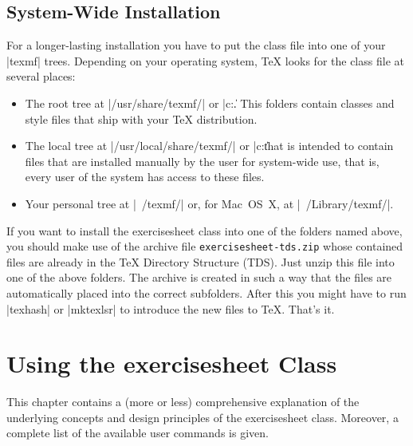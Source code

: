 \documentclass[a4paper,fleqn]{report}
\def\exercisesheet{{exercisesheet}}
\begin{document}
\section{System-Wide Installation}

For a longer-lasting installation you have to put the class file into
one of your |texmf| trees. Depending on your operating system, \TeX{}
looks for the class file at several places:
\begin{itemize}
  \item The root tree at |/usr/share/texmf/| or |c:\texmf\|. This
    folders contain classes and style files that ship with your \TeX{}
    distribution.
  \item The local tree at |/usr/local/share/texmf/| or
    |c:\localtexmf\| that is intended to contain files that are
    installed manually by the user for system-wide use, that is, every
    user of the system has access to these files.
  \item Your personal tree at |~/texmf/| or, for Mac~OS~X, at
    |~/Library/texmf/|.
\end{itemize}
If you want to install the \exercisesheet{} class into one of the
folders named above, you should make use of the archive file
\lstinline[language=bash]{exercisesheet-tds.zip} whose contained files
are already in the \TeX{} Directory Structure (TDS). Just unzip this
file into one of the above folders. The archive is created in such a
way that the files are automatically placed into the correct
subfolders. After this you might have to run |texhash| or |mktexlsr|
to introduce the new files to \TeX. That's it.


\chapter{Using the \exercisesheet{} Class}

This chapter contains a (more or less) comprehensive explanation of
the underlying concepts and design principles of the \exercisesheet{}
class. Moreover, a complete list of the available user commands is
given.


% 
\end{document}
